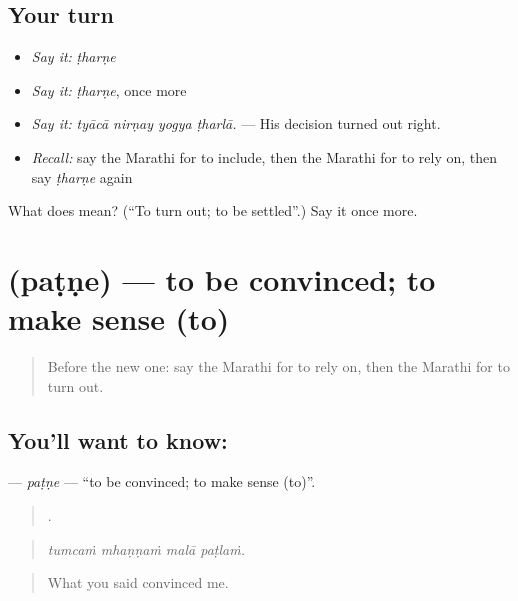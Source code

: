 \subsection*{Your turn}
\begin{itemize}
\raggedright
  \item \emph{Say it:} \emph{ṭharṇe}
  \item \emph{Say it:} \emph{ṭharṇe}, once more
  \item \emph{Say it:} \emph{tyācā nirṇay yogya ṭharlā.} — His decision turned out right.
  \item \emph{Recall:} say the Marathi for to include, then the Marathi for to rely on, then say \emph{ṭharṇe} again
\end{itemize}

\begin{tcolorbox}[breakable,colback=teal!4,colframe=teal!35!black,title={Before you move on}]
What does  mean? (\textquotedblleft{}To turn out; to be settled\textquotedblright{}.) Say it once more.
\end{tcolorbox}
\section[\texorpdfstring{\mr{पटणे} (paṭṇe)}{पटणे (paṭṇe)}]{ (paṭṇe) — to be convinced; to make sense (to)}

\label{lesson:MR-C387-patne}



\begin{quote}
Before the new one: say the Marathi for to rely on, then the Marathi for to turn out.
\end{quote}

\subsection*{You'll want to know: }
\textbf{} — \emph{paṭṇe} — \textquotedblleft{}to be convinced; to make sense (to)\textquotedblright{}.

\begin{quote}
   .
\end{quote}

\begin{quote}
\emph{tumcaṁ mhaṇṇaṁ malā paṭlaṁ.}
\end{quote}

\begin{quote}
What you said convinced me.
\end{quote}

